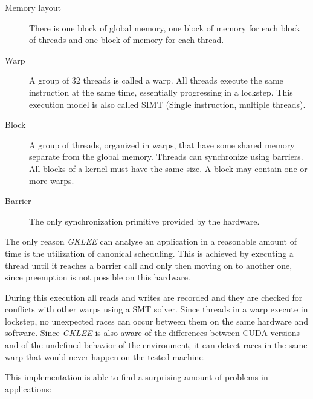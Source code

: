 \documentclass[10pt]{llncs}
\begin{document}
\begin{description}
	\item[Memory layout] There is one block of global memory, one block of memory for each block of threads and one block of memory for each thread.
	\item[Warp] A group of 32 threads is called a warp. All threads execute the same instruction at the same time, essentially progressing in a lockstep. This execution model is also called SIMT  (Single instruction, multiple threads).
	\item[Block] A group of threads, organized in warps, that have some shared memory separate from the global memory. Threads can synchronize using barriers. All blocks of a kernel must have the same size. A block may contain one or more warps.
	\item[Barrier] The only synchronization primitive provided by the hardware.
\end{description}

The only reason \emph{GKLEE} can analyse an application in a reasonable amount of time is the utilization of canonical scheduling. This is achieved by executing a thread until it reaches a barrier call and only then moving on to another one, since preemption is not possible on this hardware. 

During this execution all reads and writes are recorded and they are checked for conflicts with other warps using a SMT solver. Since threads in a warp execute in lockstep, no unexpected races can occur between them on the same hardware and software. Since \emph{GKLEE} is also aware of the differences between CUDA versions and of the undefined behavior of the environment, it can detect races in the same warp that would never happen on the tested machine.

This implementation is able to find a surprising amount of problems in applications:
\end{document}
